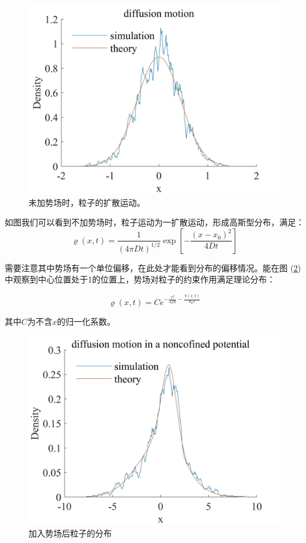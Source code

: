\begin{figure}[htbp]
    \centering
    \includegraphics[width=0.8\linewidth]{figs/扩散运动.jpg}
    \caption{未加势场时，粒子的扩散运动。}
    \label{fig:sim-no-V}
\end{figure}

如图我们可以看到不加势场时，粒子运动为一扩散运动，形成高斯型分布，满足：
\begin{equation}
    \varrho \left( x,t \right) =\frac{1}{\left( 4\pi Dt \right) ^{1/2}}\exp \left[ -\frac{\left( x-x_0 \right) ^2}{4Dt} \right]
\end{equation}

需要注意其中势场有一个单位偏移，在此处才能看到分布的偏移情况。能在图 (\ref{fig:sim-V})中观察到中心位置处于1的位置上，势场对粒子的约束作用满足理论分布：

\begin{equation}
    \varrho \left( x,t \right) =Ce^{-\frac{x^2}{4Dt}-\frac{V\left( x,t \right)}{\mathrm{k}_{0}T}}
\end{equation}

其中$C$为不含$x$的归一化系数。

\begin{figure}[htbp]
    \centering
    \includegraphics[width=0.8\linewidth]{figs/势场中的分布.jpg}
    \caption{加入势场后粒子的分布}
    \label{fig:sim-V}
\end{figure}